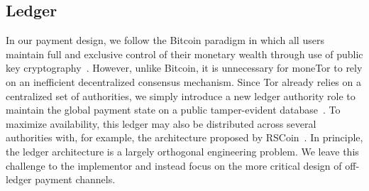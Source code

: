 %


\subsection{Ledger}

In our payment design, we follow the Bitcoin paradigm in which all users
maintain full and exclusive control of their monetary wealth through use of
public key cryptography~\cite{nakamoto2008bitcoin}. However, unlike Bitcoin, it
is unnecessary for moneTor to rely on an inefficient decentralized consensus
mechanism. Since Tor already relies on a centralized set of authorities, we
simply introduce a new ledger authority role to maintain the global payment
state on a public tamper-evident database~\cite{crosby2009efficient}. To
maximize availability, this ledger may also be distributed across several
authorities with, for example, the architecture proposed by
RSCoin~\cite{danezis2015centrally}. In principle, the ledger architecture is a
largely orthogonal engineering problem. We leave this challenge to the
implementor and instead focus on the more critical design of off-ledger payment
channels.

